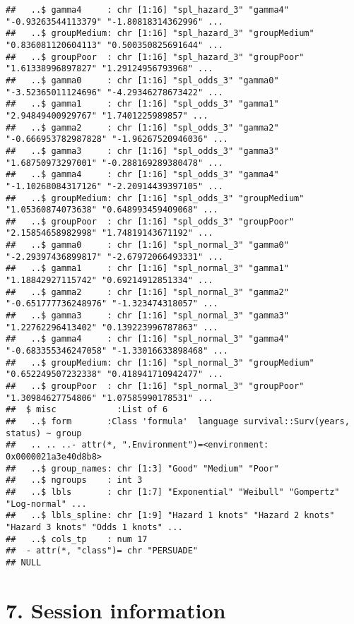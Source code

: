 \documentclass[
]{article}
\begin{document}
\begin{verbatim}
##   ..$ gamma4     : chr [1:16] "spl_hazard_3" "gamma4" "-0.93263544113379" "-1.80818314362996" ...
##   ..$ groupMedium: chr [1:16] "spl_hazard_3" "groupMedium" "0.836081120604113" "0.500350825691644" ...
##   ..$ groupPoor  : chr [1:16] "spl_hazard_3" "groupPoor" "1.61338996897827" "1.29124956793968" ...
##   ..$ gamma0     : chr [1:16] "spl_odds_3" "gamma0" "-3.52365011124696" "-4.29346278673422" ...
##   ..$ gamma1     : chr [1:16] "spl_odds_3" "gamma1" "2.94849400929767" "1.7401225989857" ...
##   ..$ gamma2     : chr [1:16] "spl_odds_3" "gamma2" "-0.666953782987828" "-1.96267520946036" ...
##   ..$ gamma3     : chr [1:16] "spl_odds_3" "gamma3" "1.68750973297001" "-0.288169289380478" ...
##   ..$ gamma4     : chr [1:16] "spl_odds_3" "gamma4" "-1.10268084317126" "-2.20914439397105" ...
##   ..$ groupMedium: chr [1:16] "spl_odds_3" "groupMedium" "1.05360874073638" "0.648993459409068" ...
##   ..$ groupPoor  : chr [1:16] "spl_odds_3" "groupPoor" "2.15854658982998" "1.74819143671192" ...
##   ..$ gamma0     : chr [1:16] "spl_normal_3" "gamma0" "-2.29397436899817" "-2.67972066493331" ...
##   ..$ gamma1     : chr [1:16] "spl_normal_3" "gamma1" "1.18842927115742" "0.69214912851334" ...
##   ..$ gamma2     : chr [1:16] "spl_normal_3" "gamma2" "-0.651777736248976" "-1.323474318057" ...
##   ..$ gamma3     : chr [1:16] "spl_normal_3" "gamma3" "1.22762296413402" "0.139223996787863" ...
##   ..$ gamma4     : chr [1:16] "spl_normal_3" "gamma4" "-0.683355346247058" "-1.33016633898468" ...
##   ..$ groupMedium: chr [1:16] "spl_normal_3" "groupMedium" "0.652249507232338" "0.418941710942477" ...
##   ..$ groupPoor  : chr [1:16] "spl_normal_3" "groupPoor" "1.30984627754806" "1.07585990178531" ...
##  $ misc            :List of 6
##   ..$ form       :Class 'formula'  language survival::Surv(years, status) ~ group
##   .. .. ..- attr(*, ".Environment")=<environment: 0x0000021a3e40d8b8> 
##   ..$ group_names: chr [1:3] "Good" "Medium" "Poor"
##   ..$ ngroups    : int 3
##   ..$ lbls       : chr [1:7] "Exponential" "Weibull" "Gompertz" "Log-normal" ...
##   ..$ lbls_spline: chr [1:9] "Hazard 1 knots" "Hazard 2 knots" "Hazard 3 knots" "Odds 1 knots" ...
##   ..$ cols_tp    : num 17
##  - attr(*, "class")= chr "PERSUADE"
## NULL
\end{verbatim}

\clearpage

\section{7. Session information}\label{session-information}
\end{document}
